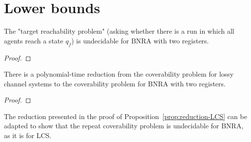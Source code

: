 \section{Lower bounds}



\begin{proposition}
	The "target reachability problem" (asking whether there is a run in which all agents reach a state $q_f$) is undecidable for BNRA with two registers.
\end{proposition}

\ifproofs
\begin{proof}
\end{proof}
\fi

\begin{proposition}
	\label{prop:reduction-LCS}
	There is a polynomial-time reduction from the coverability problem for lossy channel systems to the coverability problem for BNRA with two registers.
\end{proposition}

\ifproofs
\begin{proof}
\end{proof}
\fi

\begin{remark}
	The reduction presented in the proof of Proposition~\ref{prop:reduction-LCS} can be adapted to show that the repeat coverability problem is undecidable for BNRA, as it is for LCS.
\end{remark}
